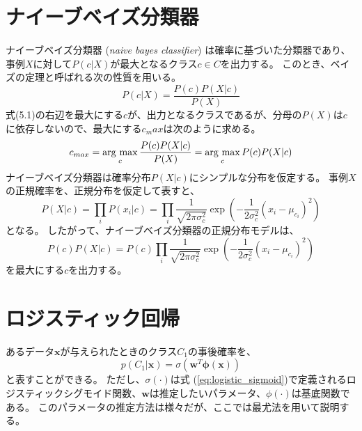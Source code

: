 \documentclass[titlepage,12pt]{jreport}
\newcommand{\argmax}{\mathop{\rm arg~max}\limits}
\begin{document}
\section{ナイーブベイズ分類器}
ナイーブベイズ分類器 ({\it naive bayes classifier}) は確率に基づいた分類器であり、事例\(X\)に対して\(P(c|X)\)が最大となるクラス\(c \in C\)を出力する。 このとき、ベイズの定理と呼ばれる次の性質を用いる。
\begin{equation}
P(c|X) = \frac{P(c)P(X|c)}{P(X)}
\end{equation}
式(5.1)の右辺を最大にする$c$が、出力となるクラスであるが、分母の\(P(X)\)は\(c\)に依存しないので、最大にする$c_max$は次のように求める。
\begin{equation}
c_{max} = \argmax_{c} \frac{P(c)P(X|c)}{P(X)} = \argmax_{c}P(c)P(X|c)
\end{equation}
ナイーブベイズ分類器は確率分布\(P(X|c)\)にシンプルな分布を仮定する。 事例$X$の正規確率を、正規分布を仮定して表すと、
\begin{equation}
P(X|c) = \prod_{i} P(x_{i}|c) = \prod_{i} \frac{1}{\sqrt{2\pi \sigma^{2}_{c}}}\exp(-\frac{1}{2\sigma^{2}_{c}}(x_{i}-\mu_{c_{i}})^{2})
\end{equation}
となる。 したがって、ナイーブベイズ分類器の正規分布モデルは、
\begin{equation}
P(c)P(X|c) = P(c)\prod_{i} \frac{1}{\sqrt{2\pi \sigma^{2}_{c}}}\exp(-\frac{1}{2\sigma^{2}_{c}}(x_{i}-\mu_{c_{i}})^{2})
\end{equation}
を最大にする\(c\)を出力する。

\section{ロジスティック回帰}
あるデータ$\bm{x}$が与えられたときのクラス$C_1$の事後確率を、
\begin{equation}
	p(C_1 | \bm{x}) = \sigma(\bm{w}^{T}\bm{\phi(x)})
\end{equation}
と表すことができる。 ただし、$\sigma(\cdot)$は式 (\ref{eq:logistic_sigmoid})で定義されるロジスティックシグモイド関数、$\bm{w}$は推定したいパラメータ、$\phi(\cdot)$は基底関数である。 このパラメータの推定方法は様々だが、ここでは最尤法を用いて説明する。
\end{document}
